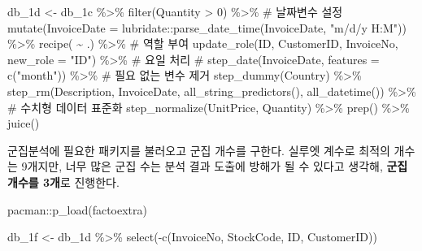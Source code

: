 \documentclass[
  letterpaper,
  DIV=11,
  numbers=noendperiod]{scrreprt}
\newenvironment{Shaded}{\begin{snugshade}}{\end{snugshade}}
\newcommand{\AttributeTok}[1]{\textcolor[rgb]{0.40,0.45,0.13}{#1}}
\newcommand{\CommentTok}[1]{\textcolor[rgb]{0.37,0.37,0.37}{#1}}
\newcommand{\DecValTok}[1]{\textcolor[rgb]{0.68,0.00,0.00}{#1}}
\newcommand{\FunctionTok}[1]{\textcolor[rgb]{0.28,0.35,0.67}{#1}}
\newcommand{\NormalTok}[1]{\textcolor[rgb]{0.00,0.23,0.31}{#1}}
\newcommand{\OtherTok}[1]{\textcolor[rgb]{0.00,0.23,0.31}{#1}}
\newcommand{\SpecialCharTok}[1]{\textcolor[rgb]{0.37,0.37,0.37}{#1}}
\newcommand{\StringTok}[1]{\textcolor[rgb]{0.13,0.47,0.30}{#1}}
\begin{document}
\begin{Shaded}
\begin{Highlighting}[]
\NormalTok{db\_1d }\OtherTok{\textless{}{-}}\NormalTok{ db\_1c }\SpecialCharTok{\%\textgreater{}\%}
  \FunctionTok{filter}\NormalTok{(Quantity }\SpecialCharTok{\textgreater{}} \DecValTok{0}\NormalTok{) }\SpecialCharTok{\%\textgreater{}\%}
  \CommentTok{\# 날짜변수 설정}
  \FunctionTok{mutate}\NormalTok{(}\AttributeTok{InvoiceDate =}\NormalTok{ lubridate}\SpecialCharTok{::}\FunctionTok{parse\_date\_time}\NormalTok{(InvoiceDate, }\StringTok{"m/d/y H:M"}\NormalTok{)) }\SpecialCharTok{\%\textgreater{}\%}
  \FunctionTok{recipe}\NormalTok{( }\SpecialCharTok{\textasciitilde{}}\NormalTok{ .) }\SpecialCharTok{\%\textgreater{}\%}
  \CommentTok{\# 역할 부여}
  \FunctionTok{update\_role}\NormalTok{(ID, CustomerID, InvoiceNo, }\AttributeTok{new\_role =} \StringTok{"ID"}\NormalTok{) }\SpecialCharTok{\%\textgreater{}\%}
  \CommentTok{\# 요일 처리}
  \CommentTok{\# step\_date(InvoiceDate, features = c("month")) \%\textgreater{}\%}
    \CommentTok{\# 필요 없는 변수 제거}
  \FunctionTok{step\_dummy}\NormalTok{(Country) }\SpecialCharTok{\%\textgreater{}\%}
  \FunctionTok{step\_rm}\NormalTok{(Description, InvoiceDate, }\FunctionTok{all\_string\_predictors}\NormalTok{(), }\FunctionTok{all\_datetime}\NormalTok{()) }\SpecialCharTok{\%\textgreater{}\%}
  \CommentTok{\# 수치형 데이터 표준화}
  \FunctionTok{step\_normalize}\NormalTok{(UnitPrice, Quantity) }\SpecialCharTok{\%\textgreater{}\%}
  \FunctionTok{prep}\NormalTok{() }\SpecialCharTok{\%\textgreater{}\%} \FunctionTok{juice}\NormalTok{()}
\end{Highlighting}
\end{Shaded}

군집분석에 필요한 패키지를 불러오고 군집 개수를 구한다. 실루엣 계수로
최적의 개수는 9개지만, 너무 많은 군집 수는 분석 결과 도출에 방해가 될 수
있다고 생각해, \textbf{군집 개수를 3개}로 진행한다.

\begin{Shaded}
\begin{Highlighting}[]
\NormalTok{pacman}\SpecialCharTok{::}\FunctionTok{p\_load}\NormalTok{(factoextra)}

\NormalTok{db\_1f }\OtherTok{\textless{}{-}}\NormalTok{ db\_1d }\SpecialCharTok{\%\textgreater{}\%}
  \FunctionTok{select}\NormalTok{(}\SpecialCharTok{{-}}\FunctionTok{c}\NormalTok{(InvoiceNo, StockCode, ID, CustomerID))}
\end{Highlighting}
\end{Shaded}
\end{document}
